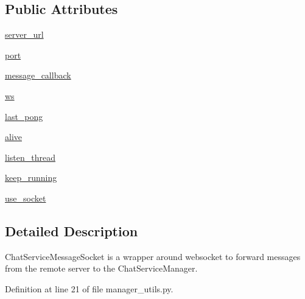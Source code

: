 \subsection*{Public Attributes}
\begin{DoxyCompactItemize}
\item 
\hyperlink{classparlai_1_1chat__service_1_1core_1_1manager__utils_1_1ChatServiceMessageSocket_a42860d1afbafa3cb98688feae503bcef}{server\+\_\+url}
\item 
\hyperlink{classparlai_1_1chat__service_1_1core_1_1manager__utils_1_1ChatServiceMessageSocket_a0dfdf8ef9c7388e55d7c174ee01fc572}{port}
\item 
\hyperlink{classparlai_1_1chat__service_1_1core_1_1manager__utils_1_1ChatServiceMessageSocket_a8a28e261f70852625b02a1ec5c18356a}{message\+\_\+callback}
\item 
\hyperlink{classparlai_1_1chat__service_1_1core_1_1manager__utils_1_1ChatServiceMessageSocket_a40815e1425dd12525060427d99c85b78}{ws}
\item 
\hyperlink{classparlai_1_1chat__service_1_1core_1_1manager__utils_1_1ChatServiceMessageSocket_a548c52469eba4c8a4d5d047caf031d05}{last\+\_\+pong}
\item 
\hyperlink{classparlai_1_1chat__service_1_1core_1_1manager__utils_1_1ChatServiceMessageSocket_a56247cb3af9fce17b726e63f43d30914}{alive}
\item 
\hyperlink{classparlai_1_1chat__service_1_1core_1_1manager__utils_1_1ChatServiceMessageSocket_a5a78df442fb45c0d0e099b59833d8216}{listen\+\_\+thread}
\item 
\hyperlink{classparlai_1_1chat__service_1_1core_1_1manager__utils_1_1ChatServiceMessageSocket_a34cf8032c69d53ba0539c355d52d7aff}{keep\+\_\+running}
\item 
\hyperlink{classparlai_1_1chat__service_1_1core_1_1manager__utils_1_1ChatServiceMessageSocket_af1c65756d630bd95b2cced749cabbb4d}{use\+\_\+socket}
\end{DoxyCompactItemize}


\subsection{Detailed Description}
\begin{DoxyVerb}ChatServiceMessageSocket is a wrapper around websocket to forward messages from the
remote server to the ChatServiceManager.
\end{DoxyVerb}
 

Definition at line 21 of file manager\+\_\+utils.\+py.



